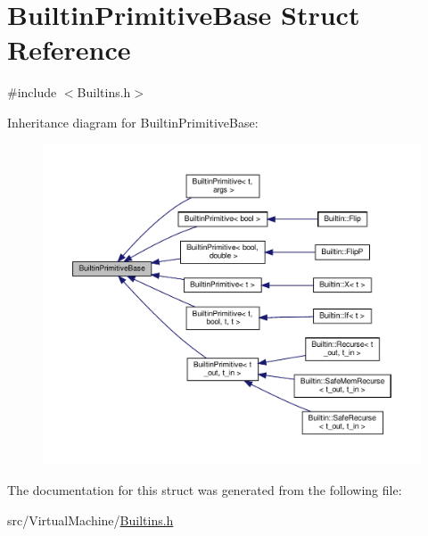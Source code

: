 \hypertarget{struct_builtin_primitive_base}{}\section{Builtin\+Primitive\+Base Struct Reference}
\label{struct_builtin_primitive_base}


{\ttfamily \#include $<$Builtins.\+h$>$}



Inheritance diagram for Builtin\+Primitive\+Base\+:
\nopagebreak
\begin{figure}[H]
\begin{center}
\leavevmode
\includegraphics[width=350pt]{struct_builtin_primitive_base__inherit__graph}
\end{center}
\end{figure}


The documentation for this struct was generated from the following file\+:\begin{DoxyCompactItemize}
\item 
src/\+Virtual\+Machine/\hyperlink{_builtins_8h}{Builtins.\+h}\end{DoxyCompactItemize}
